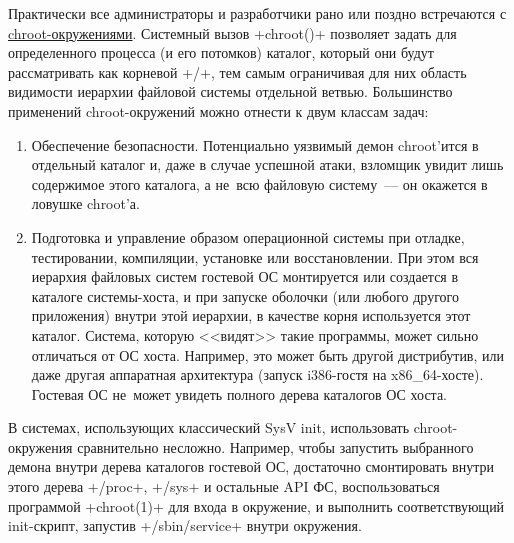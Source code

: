 \documentclass[10pt,oneside,a4paper]{article}
\begin{document}
Практически все администраторы и разработчики рано или поздно встречаются с
\href{http://linux.die.net/man/1/chroot}{chroot-окружениями}. Системный вызов
+chroot()+ позволяет задать для определенного процесса (и его потомков) каталог,
который они будут рассматривать как корневой +/+, тем самым ограничивая для них
область видимости иерархии файловой системы отдельной ветвью. Большинство
применений chroot-окружений можно отнести к двум классам задач:
\begin{enumerate}
	\item Обеспечение безопасности. Потенциально уязвимый демон chroot'ится
		в отдельный каталог и, даже в случае успешной атаки, взломщик
		увидит лишь содержимое этого каталога, а не~всю файловую
		систему~--- он окажется в ловушке chroot'а.
	\item Подготовка и управление образом операционной системы при отладке,
		тестировании, компиляции, установке или восстановлении. При этом
		вся иерархия файловых систем гостевой ОС монтируется или
		создается в каталоге системы-хоста, и при запуске оболочки (или
		любого другого приложения) внутри этой иерархии, в качестве
		корня используется этот каталог. Система, которую <<видят>>
		такие программы, может сильно отличаться от ОС хоста. Например,
		это может быть другой дистрибутив, или даже другая аппаратная
		архитектура (запуск i386-гостя на x86\_64-хосте). Гостевая ОС
		не~может увидеть полного дерева каталогов ОС хоста.
\end{enumerate}

В системах, использующих классический SysV init, использовать chroot-окружения
сравнительно несложно. Например, чтобы запустить выбранного демона внутри дерева
каталогов гостевой ОС, достаточно смонтировать внутри этого дерева +/proc+,
+/sys+ и остальные API ФС, воспользоваться программой +chroot(1)+ для входа в
окружение, и выполнить соответствующий init-скрипт, запустив +/sbin/service+
внутри окружения.
\end{document}
